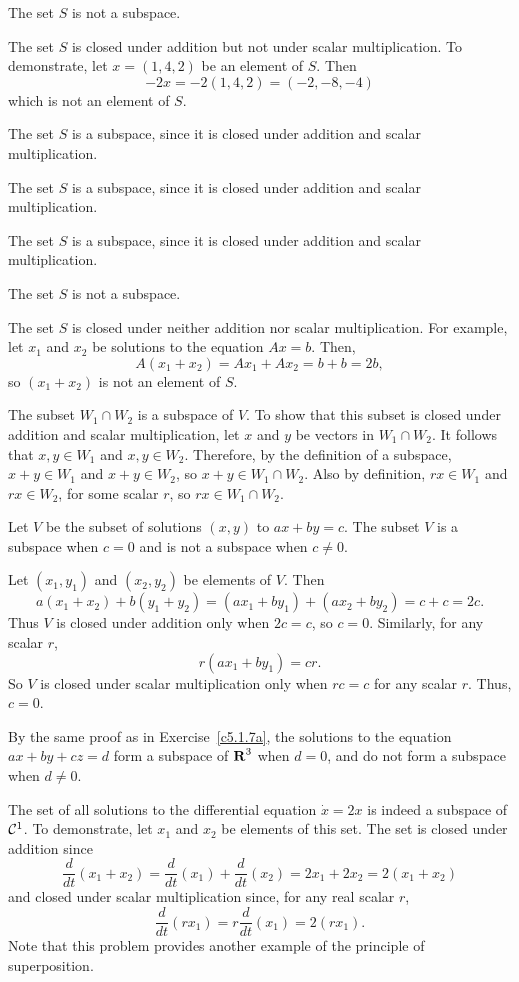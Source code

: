  \ans The set $S$ is not a subspace.

\soln The set $S$ is closed under addition but not under scalar
multiplication.  To demonstrate, let $x = (1,4,2)$ be an element of $S$. 
Then
\[
-2x = -2(1,4,2) = (-2,-8,-4)
\]
which is not an element of $S$.

 The set $S$ is a subspace, since it is closed under
addition and scalar multiplication.

\newpage 
{} The set $S$ is a subspace, since it is closed under
addition and scalar multiplication.

 The set $S$ is a subspace, since it is closed under
addition and scalar multiplication.

 \ans The set $S$ is not a subspace.

\soln The set $S$ is closed under neither addition nor scalar
multiplication.  For example, let $x_1$ and $x_2$ be solutions to the
equation $Ax = b$.  Then,
\[
A(x_1 + x_2) = Ax_1 + Ax_2 = b + b = 2b,
\]
so $(x_1 + x_2)$ is not an element of $S$.

The subset $W_1 \cap W_2$ is a subspace of $V$.  To show that this
subset is closed under addition and scalar multiplication, 
let $x$ and $y$ be vectors in $W_1 \cap W_2$.  It follows that
$x,y \in W_1$ and $x,y \in W_2$.  Therefore, by the
definition of a subspace, $x + y \in W_1$ and $x + y \in W_2$, so
$x + y \in W_1 \cap W_2$.  Also by definition, $rx \in W_1$ and
$rx \in W_2$, for some scalar $r$, so $rx \in W_1 \cap W_2$.

\ans Let $V$ be the subset of solutions $(x,y)$ to $ax + by = c$.
The subset $V$ is a subspace when $c = 0$ and is not a subspace
when $c \neq 0$. 

\soln Let $(x_1,y_1)$ and $(x_2,y_2)$ be elements of $V$.  Then
\[
a(x_1 + x_2) + b(y_1 + y_2) = (ax_1 + by_1) + (ax_2 + by_2) =
c + c = 2c.
\]
Thus $V$ is closed under addition only when $2c = c$, so $c = 0$.
Similarly, for any scalar $r$,
\[
r(ax_1 + by_1) = cr.
\]
So $V$ is closed under scalar multiplication only when $rc = c$ for
any scalar $r$.  Thus, $c = 0$.

\ans By the same proof as in Exercise~\ref{c5.1.7a}, the solutions to the
equation $ax + by + cz = d$ form a subspace of $\mbox{$\bf{R}$}^3$ when $d = 0$,
and do not form a subspace when $d \neq 0$.

The set of all solutions to the differential equation $\dot{x} = 2x$ is
indeed a subspace of ${\cal C}^1$.  To demonstrate, let $x_1$ and $x_2$
be elements of this set.  The set is closed under addition since
\[
\frac{d}{dt}(x_1 + x_2) = \frac{d}{dt}(x_1) + \frac{d}{dt}(x_2)
= 2x_1 + 2x_2 = 2(x_1 + x_2)
\]
and closed under scalar multiplication since, for any real scalar $r$,
\[
\frac{d}{dt}(rx_1) = r\frac{d}{dt}(x_1) = 2(rx_1).
\]
Note that this problem provides another example of the principle of
superposition.

